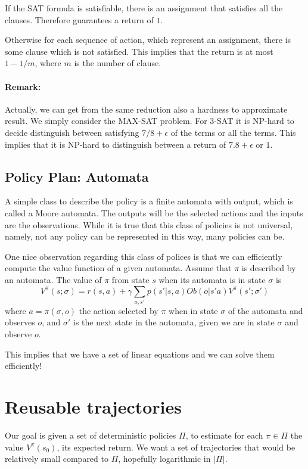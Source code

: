 If the SAT formula is satisfiable, there is an assignment that
satisfies all the clauses. Therefore guarantees a return of $1$.

Otherwise for each sequence of action, which represent an
assignment, there is some clause which is not satisfied. This
implies that the return is at most $1-1/m$, where $m$ is the number
of clause.

\paragraph{Remark:} Actually, we can get from the same reduction
also a hardness to approximate result. We simply consider the
MAX-SAT problem. For 3-SAT it is NP-hard to decide distinguish
between satisfying $7/8+\epsilon$ of the terms or all the terms.
This implies that it is NP-hard to distinguish between a return of
$7.8+\epsilon$ or $1$.

\subsection{Policy Plan: Automata}

A simple class to describe the policy is a finite automata with
output, which is called a Moore automata. The outputs will be the
selected actions and the inputs are the observations. While it is
true that this class of policies is not universal, namely, not any
policy can be represented in this way, many policies can be.

One nice observation regarding this class of polices is that we can
efficiently compute the value function of a given automata. Assume
that $\pi$ is described by an automata. The value of $\pi$ from
state $s$ when its automata is in state $\sigma$ is
\[
V^\pi(s;\sigma)=r(s,a)+\gamma \sum_{o,s'}
p(s'|s,a)Ob(o|s'a)V^\pi(s';\sigma')
\]
where $a=\pi(\sigma,o)$ the action selected by $\pi$ when in state
$\sigma$ of the automata and observes $o$, and $\sigma'$ is the next
state in the automata, given we are in state $\sigma$ and observe
$o$.

This implies that we have a set of linear equations and we can solve
them efficiently!


\section{Reusable trajectories}

Our goal is given a set of deterministic policies $\Pi$, to estimate
for each $\pi\in \Pi$ the value $V^\pi(s_0)$, its expected return.
We want a set of trajectories that would be relatively small
compared to $\Pi$, hopefully logarithmic in $|\Pi|$.

